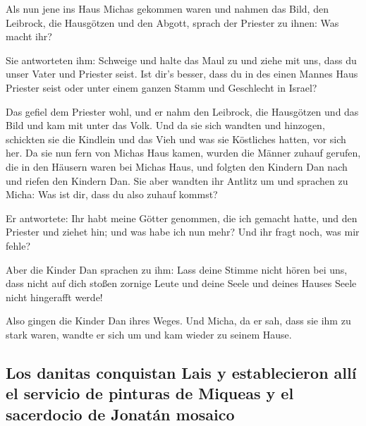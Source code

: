  Als nun jene ins Haus Michas gekommen waren und nahmen
das Bild, den Leibrock, die Hausgötzen und den Abgott, sprach der
Priester zu ihnen: Was macht ihr?

 Sie antworteten ihm: Schweige und halte das Maul zu und
ziehe mit uns, dass du unser Vater und Priester seist. Ist dir's besser,
dass du in des einen Mannes Haus Priester seist oder unter einem ganzen
Stamm und Geschlecht in Israel?

 Das gefiel dem Priester wohl, und er nahm den Leibrock,
die Hausgötzen und das Bild und kam mit unter das Volk. 
Und da sie sich wandten und hinzogen, schickten sie die Kindlein und das
Vieh und was sie Köstliches hatten, vor sich her.  Da sie
nun fern von Michas Haus kamen, wurden die Männer zuhauf gerufen, die in
den Häusern waren bei Michas Haus, und folgten den Kindern Dan nach und
riefen den Kindern Dan.  Sie aber wandten ihr Antlitz um
und sprachen zu Micha: Was ist dir, dass du also zuhauf kommst?

 Er antwortete: Ihr habt meine Götter genommen, die ich
gemacht hatte, und den Priester und ziehet hin; und was habe ich nun
mehr? Und ihr fragt noch, was mir fehle?

 Aber die Kinder Dan sprachen zu ihm: Lass deine Stimme
nicht hören bei uns, dass nicht auf dich stoßen zornige Leute und deine
Seele und deines Hauses Seele nicht hingerafft werde!

 Also gingen die Kinder Dan ihres Weges. Und Micha, da er
sah, dass sie ihm zu stark waren, wandte er sich um und kam wieder zu
seinem Hause.

\hypertarget{los-danitas-conquistan-lais-y-establecieron-alluxed-el-servicio-de-pinturas-de-miqueas-y-el-sacerdocio-de-jonatuxe1n-mosaico}{%
\subsection{Los danitas conquistan Lais y establecieron allí el servicio
de pinturas de Miqueas y el sacerdocio de Jonatán
mosaico}\label{los-danitas-conquistan-lais-y-establecieron-alluxed-el-servicio-de-pinturas-de-miqueas-y-el-sacerdocio-de-jonatuxe1n-mosaico}}

